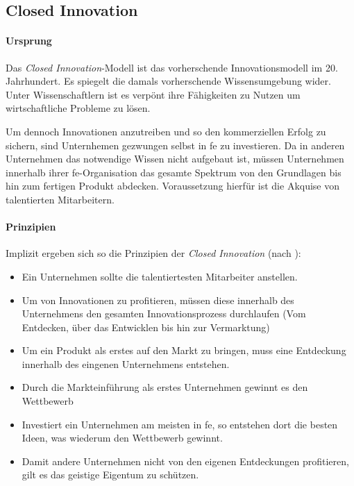 \subsection{Closed Innovation}\label{sec:grundlagen-closed}

\paragraph{Ursprung}
Das \textit{Closed Innovation}-Modell ist das vorherschende Innovationsmodell im 20. Jahrhundert.
Es spiegelt die damals vorherschende Wissensumgebung wider.
Unter Wissenschaftlern ist es verpönt ihre Fähigkeiten zu Nutzen um wirtschaftliche Probleme zu lösen.

Um dennoch Innovationen anzutreiben und so den kommerziellen Erfolg zu sichern,
sind Unternhemen gezwungen selbst in \ac{fe} zu investieren.
Da in anderen Unternehmen das notwendige Wissen nicht aufgebaut ist,
müssen Unternehmen innerhalb ihrer \ac{fe}-Organisation das gesamte Spektrum von den Grundlagen bis hin zum fertigen Produkt abdecken.
Voraussetzung hierfür ist die Akquise von talentierten Mitarbeitern.


\paragraph{Prinzipien}
Implizit ergeben sich so die Prinzipien der \textit{Closed Innovation} (nach \cite[19]{herzog2011}):
\begin{itemize}
    \item Ein Unternehmen sollte die talentiertesten Mitarbeiter anstellen.
    \item Um von Innovationen zu profitieren, müssen diese innerhalb des Unternehmens den gesamten Innovationsprozess durchlaufen (Vom Entdecken, über das Entwicklen bis hin zur Vermarktung)
    \item Um ein Produkt als erstes auf den Markt zu bringen, muss eine Entdeckung innerhalb des eingenen Unternehmens entstehen.
    \item Durch die Markteinführung als erstes Unternehmen gewinnt es den Wettbewerb
    \item Investiert ein Unternehmen am meisten in \ac{fe}, so entstehen dort die besten Ideen, was wiederum den Wettbewerb gewinnt.
    \item Damit andere Unternehmen nicht von den eigenen Entdeckungen profitieren, gilt es das geistige Eigentum zu schützen.
\end{itemize}

